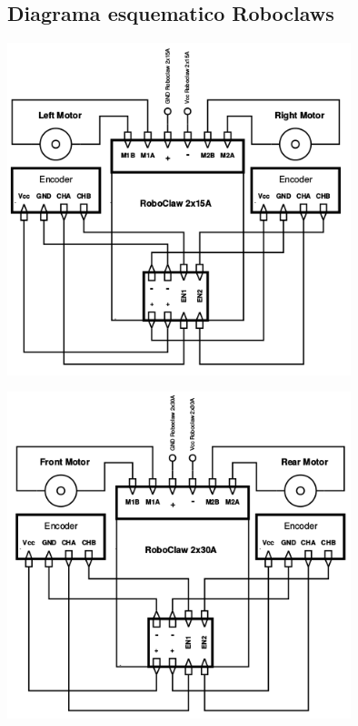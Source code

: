 \documentclass[a4paper]{book}
\begin{document}
\subsection{Diagrama esquematico Roboclaws}

\begin{center}
\includegraphics[width=0.75\textwidth]{Figures/Hardware/Esquematicos/Roboclaw_1.png}
\label{fig:Hardware:Partes:Diagrama:Esquematico:Roboclaw:1}
\end{center}

\begin{center}
\includegraphics[width=0.75\textwidth]{Figures/Hardware/Esquematicos/Roboclaw_2.png}
\label{fig:Hardware:Partes:Diagrama:Esquematico:Roboclaw:2}
\end{center}
\end{document}
